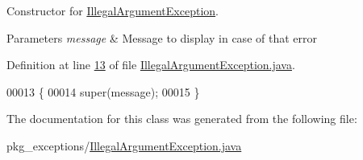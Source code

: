 Constructor for \hyperlink{classpkg__exceptions_1_1IllegalArgumentException}{Illegal\-Argument\-Exception}. 


\begin{DoxyParams}{Parameters}
{\em message} & Message to display in case of that error \\
\hline
\end{DoxyParams}


Definition at line \hyperlink{IllegalArgumentException_8java_source_l00013}{13} of file \hyperlink{IllegalArgumentException_8java_source}{Illegal\-Argument\-Exception.\-java}.


\begin{DoxyCode}
00013                                                    \{
00014         super(message);
00015     \}
\end{DoxyCode}


The documentation for this class was generated from the following file\-:\begin{DoxyCompactItemize}
\item 
pkg\-\_\-exceptions/\hyperlink{IllegalArgumentException_8java}{Illegal\-Argument\-Exception.\-java}\end{DoxyCompactItemize}
